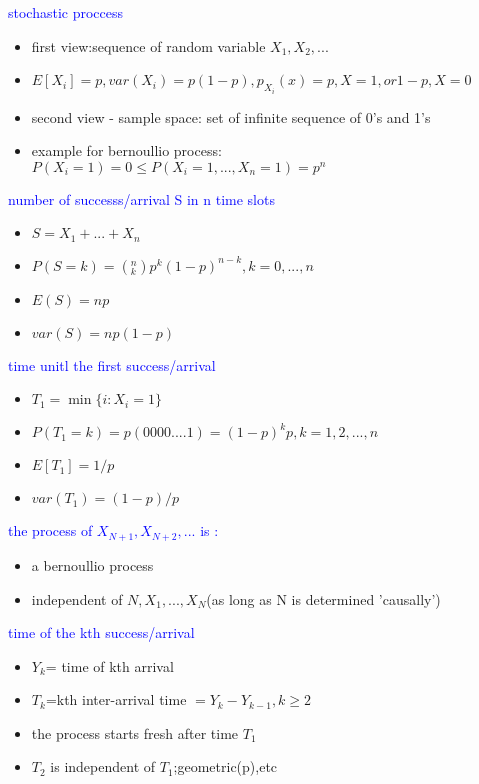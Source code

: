 \textcolor{blue}{stochastic proccess}

\begin{itemize}
    \item first view:sequence of random variable $X_1,X_2,...$
    \item $E[X_i]=p,var(X_i)=p(1-p),p_{X_i}(x)=p,X=1,or 1-p,X=0$
    \item second view - sample space: set of infinite sequence of 0's and 1's
    \item example for bernoullio process:$P(X_i=1)=0\leq P(X_i=1,...,X_n=1)=p^n$
\end{itemize}


\textcolor{blue}{number of successs/arrival S in n time slots}

\begin{itemize}
    \item $S=X_1+...+X_n$
    \item $P(S=k)=(^n_k)p^k(1-p)^{n-k},k=0,...,n$
    \item $E(S)=np$
    \item $var(S)=np(1-p)$
\end{itemize}

\textcolor{blue}{time unitl the first success/arrival}

\begin{itemize}
    \item $T_1=\min\{i:X_i=1\}$
    \item $P(T_1=k)=p(0000....1)=(1-p)^kp,k=1,2,...,n$
    \item $E[T_1]=1/p$
    \item $var(T_1)=(1-p)/p$
\end{itemize}


\textcolor{blue}{the process of $X_{N+1},X_{N+2},...$ is :}
\begin{itemize}
    \item a bernoullio process
    \item independent of $N,X_1,...,X_N$(as long as N is determined 'causally')
\end{itemize}

\textcolor{blue}{time of the kth success/arrival}
\begin{itemize}
    \item $Y_k$= time of kth arrival
    \item $T_k$=kth inter-arrival time $=Y_k-Y_{k-1},k\ge 2$
    \item the process starts fresh after time $T_1$
    \item $T_2$ is independent of $T_1$;geometric(p),etc
\end{itemize}


